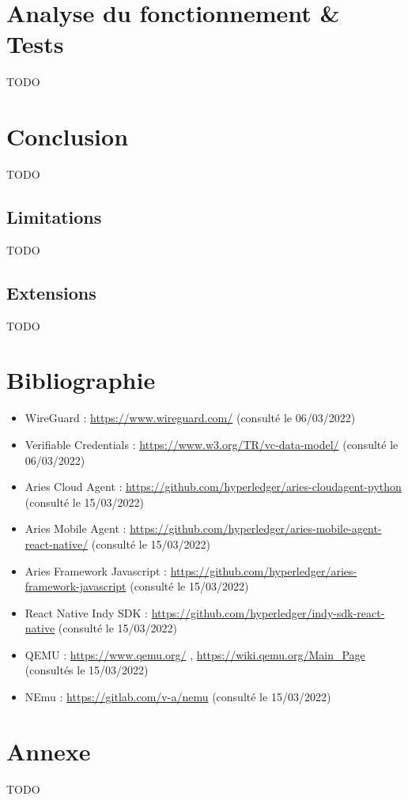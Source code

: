 \documentclass[12pt, openany]{report}
\begin{document}
\section{Analyse du fonctionnement \& Tests}
\noindent 
\begin{flushleft}
TODO
\end{flushleft}

\section{Conclusion}
\noindent 
\begin{flushleft}
TODO
\end{flushleft}
\subsection{Limitations}
\noindent 
\begin{flushleft}
TODO
\end{flushleft}
\subsection{Extensions}
\noindent 
\begin{flushleft}
TODO
\end{flushleft}

\section{Bibliographie}
\noindent 
\begin{itemize}

\item WireGuard : \url{https://www.wireguard.com/} (consulté le 06/03/2022) 
\item Verifiable Credentials : \url{https://www.w3.org/TR/vc-data-model/} (consulté le 06/03/2022) 
\item Aries Cloud Agent : \url{https://github.com/hyperledger/aries-cloudagent-python} (consulté le 15/03/2022)
\item Aries Mobile Agent : \url{https://github.com/hyperledger/aries-mobile-agent-react-native/} (consulté le 15/03/2022)
\item Aries Framework Javascript : \url{https://github.com/hyperledger/aries-framework-javascript} (consulté le 15/03/2022)
\item React Native Indy SDK : \url{https://github.com/hyperledger/indy-sdk-react-native} (consulté le 15/03/2022)
\item QEMU : \url{https://www.qemu.org/} , \url{https://wiki.qemu.org/Main_Page} (consultés le 15/03/2022)
\item NEmu : \url{https://gitlab.com/v-a/nemu} (consulté le 15/03/2022)

\end{itemize}

\section{Annexe}
\noindent 
\begin{flushleft}
TODO
\end{flushleft}
\end{document}
